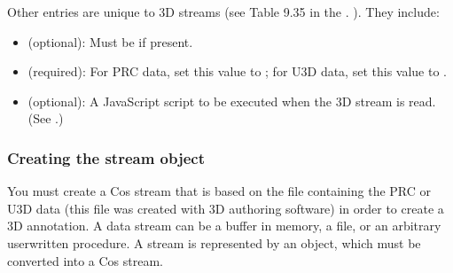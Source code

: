\documentclass[letterpaper,12pt,english,openany,oneside]{sphinxmanual}
\begin{document}
Other entries are unique to 3D streams (see Table 9.35 in the . ). They include:
\begin{itemize}
\item {} 
 (optional): Must be  if present.

\item {} 
 (required): For PRC data, set this value to  ; for U3D data, set this value to .

\item {} 
 (optional): A JavaScript script to be executed when the 3D stream is read. (See .)

\end{itemize}


\subsubsection{Creating the stream object}
\label{\detokenize{Plugins_3D_samples:creating-the-stream-object}}
You must create a Cos stream that is based on the file containing the PRC or U3D data (this file was created with 3D authoring software) in order to create a 3D annotation. A data stream can be a buffer in memory, a file, or an arbitrary user\sphinxhyphen{}written procedure. A stream is represented by an  object, which must be converted into a Cos stream.
\end{document}
